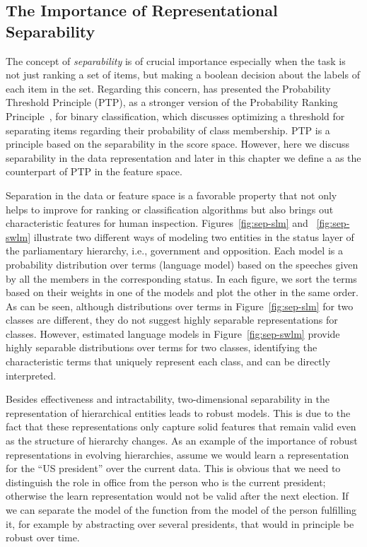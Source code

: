 \subsection{The Importance of Representational Separability}
The concept of \emph{separability} is of crucial importance especially when the task is not just ranking a set of items, but making a boolean decision about the labels of each item in the set.
Regarding this concern, \citet{Lewis:1995} has presented the Probability Threshold Principle (PTP), as a stronger version of the Probability Ranking Principle~\citep{Robertson:1977}, for binary classification, which discusses optimizing a threshold for separating items regarding their probability of class membership. 
PTP is a principle based on the separability in the score space. However, here we discuss separability in the data representation and later in this chapter we define a \emph{\ssp} as the counterpart of PTP in the feature space.

Separation in the data or feature space is a favorable property that not only helps to improve for ranking or classification algorithms but also brings out characteristic features for human inspection.
Figures~\ref{fig:sep-slm} and ~\ref{fig:sep-swlm} illustrate two different ways of modeling two entities in the status layer of the parliamentary hierarchy, i.e., government and opposition. 
Each model is a probability distribution over terms (language model) based on the speeches given by all the members in the corresponding status. In each figure, we sort the terms based on their weights in one of the models and plot the other in the same order. 
%
As can be seen, although distributions over terms in Figure~\ref{fig:sep-slm} for two classes are different, they do not suggest highly separable representations for classes. However, estimated language models in Figure~\ref{fig:sep-swlm} provide highly separable distributions over terms for two classes, identifying the characteristic terms that uniquely represent each class, and can be directly interpreted.  
 
Besides effectiveness and intractability, two\:-\:dimensional separability in the representation of hierarchical entities leads to robust models. This is due to the fact that these representations only capture solid features that remain valid even as the structure of hierarchy changes.
As an example of the importance of robust representations in evolving hierarchies, assume we would learn a representation for the ``US president'' over the current data. This is obvious that we need to distinguish the role in office from the person who is the current president; otherwise the learn representation would not be valid after the next election.  If we can separate the model of the function from the model of the person fulfilling it, for example by abstracting over several presidents, that would in principle be robust over time.

